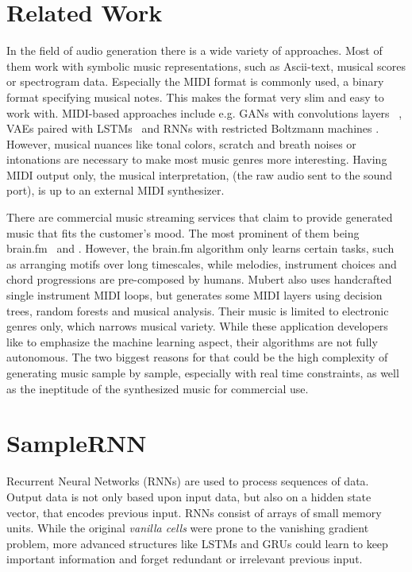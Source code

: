 \documentclass[12pt]{article}
\begin{document}
\section{Related Work}
In the field of audio generation there is a wide variety of approaches.
Most of them work with symbolic music representations, such as Ascii-text, musical scores or spectrogram data.
Especially the MIDI format is commonly used, a binary format specifying musical notes.
This makes the format very slim and easy to work with.
MIDI-based approaches include e.g. GANs with convolutions layers ~\cite{yang2017midinet, mogren2016c, mogren2016c}, VAEs paired with LSTMs~\cite{roberts2018hierarchical, tikhonov2017music, hennig2017classifying} and RNNs with restricted Boltzmann machines \cite{boulanger2012modeling}.
However, musical nuances like tonal colors, scratch and breath noises or intonations are necessary to make most music genres more interesting.
Having MIDI output only, the musical interpretation, (the raw audio sent to the sound port), is up to an external MIDI synthesizer.

There are commercial music streaming services that claim to provide generated music that fits the customer's mood.
The most prominent of them being brain.fm~\cite{brain.fm} and \cite{mubert}.
However, the brain.fm algorithm only learns certain tasks, such as arranging motifs over long timescales, while melodies, instrument choices and chord progressions are pre-composed by humans.
Mubert also uses handcrafted single instrument MIDI loops, but generates some MIDI layers using decision trees, random forests and musical analysis.
Their music is limited to electronic genres only, which narrows musical variety.
While these application developers like to emphasize the machine learning aspect, their algorithms are not fully autonomous.
The two biggest reasons for that could be the high complexity of generating music sample by sample, especially with real time constraints, as well as the ineptitude of the synthesized music for commercial use.




\section{SampleRNN}
Recurrent Neural Networks (RNNs) are used to process sequences of data.
Output data is not only based upon input data, but also on a hidden state vector, that encodes previous input.
RNNs consist of arrays of small memory units.
While the original \emph{vanilla cells} were prone to the vanishing gradient problem, more advanced structures like LSTMs and GRUs could learn to keep important information and forget redundant or irrelevant previous input.
\end{document}
